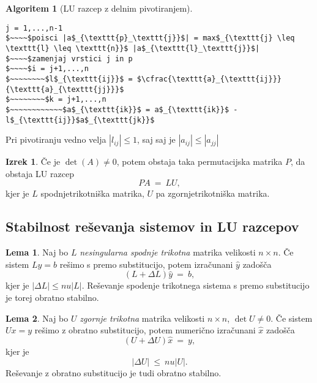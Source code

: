\documentclass[11pt]{article}
\theoremstyle{definition}
\newtheorem{lema}{Lema}
\newtheorem{izrek}{Izrek}
\newtheorem*{algoritem}{Algoritem}
\begin{document}
\begin{algoritem}[LU razcep z delnim pivotiranjem]
~
\begin{lstlisting}
j = 1,...,n-1
$~~~~$poisci |a$_{\texttt{p}_\texttt{j}}$| = max$_{\texttt{j} \leq \texttt{l} \leq \texttt{n}}$ |a$_{\texttt{l}_\texttt{j}}$|
$~~~~$zamenjaj vrstici j in p
$~~~~$i = j+1,...,n
$~~~~~~~~$l$_{\texttt{ij}}$ = $\cfrac{\texttt{a}_{\texttt{ij}}}{\texttt{a}_{\texttt{jj}}}$
$~~~~~~~~$k = j+1,...,n
$~~~~~~~~~~~~$a$_{\texttt{ik}}$ = a$_{\texttt{ik}}$ - l$_{\texttt{ij}}$a$_{\texttt{jk}}$
\end{lstlisting}
Pri pivotiranju vedno velja $|l_{ij}| \leq 1$, saj saj je $|a_{ij}| \leq |a_{jj}|$ 

\end{algoritem}
\vspace{0.5cm}

\begin{izrek}

Če je $\det{(A)} \neq 0$, potem obstaja taka permutacijska matrika $P$, da obstaja LU razcep 
$$PA ~=~ LU,$$
kjer je $L$ spodnjetrikotniška matrika, $U$ pa zgornjetrikotniška matrika.

\end{izrek}
\vspace{0.5cm}


\subsection{Stabilnost reševanja sistemov in LU razcepov}
\vspace{0.5cm}

\begin{lema}

Naj bo $L$ \textit{nesingularna spodnje trikotna} matrika velikosti $n \times n$. Če sistem $Ly = b$ rešimo s premo substitucijo, potem izračunani $\hat{y}$ zadošča
$$(L + \Delta L) \hat{y} ~=~ b,$$
kjer je $|\Delta L| \leq n u |L|$. Reševanje spodenje trikotnega sistema s premo substitucijo je torej obratno stabilno.

\end{lema}
\vspace{0.5cm}

\begin{lema}

Naj bo $U$ \textit{zgornje trikotna} matrika velikosti $n \times n$, $\det{U} \neq 0$. Če sistem $Ux = y$ rešimo z obratno substitucijo, potem numerično izračunani $\hat{x}$ zadošča
$$(U + \Delta U) \hat{x} ~=~ y,$$
kjer je 
$$|\Delta U| ~\leq~ n u |U|.$$ 
Reševanje z obratno substitucijo je tudi obratno stabilno.

\end{lema}
\vspace{0.5cm}
\end{document}
